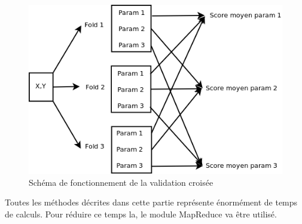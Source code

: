 \begin{figure}[htpb]
	\centering
	\includegraphics[scale = 0.25]{images/Valid_Croisee}
	\caption{Schéma de fonctionnement de la validation croisée}
	\label{fig:Valid_Croisee_param}
\end{figure}


Toutes les méthodes décrites dans cette partie représente énormément de temps de calculs.
Pour réduire ce temps la, le module MapReduce va être utilisé. 